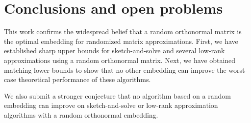 \documentclass[11pt]{article}
\theoremstyle{definition}
\numberwithin{equation}{section}
\begin{document}
\section{Conclusions and open problems} \label{sec:conclusion}

This work confirms the widespread belief that a random orthonormal matrix is the optimal embedding for randomized matrix approximations.
First, we have established sharp upper bounds for sketch-and-solve and several low-rank approximations using a random orthonormal matrix.
Next, we have obtained matching lower bounds to show that no other embedding can improve the worst-case theoretical performance of these algorithms.

We also submit a stronger conjecture that
no algorithm based on a random embedding
can improve on
sketch-and-solve or low-rank approximation algorithms with a random orthonormal embedding.
\end{document}
